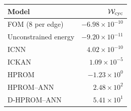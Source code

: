 \begin{tabular}{lr}
\toprule
Model & $\mathcal W_{\rm cyc}$ \\
\midrule
FOM (8 per edge) & $-6.98\times10^{-10}$ \\
Unconstrained energy & $-9.20\times10^{-11}$ \\
ICNN & $4.02\times10^{-10}$ \\
ICKAN & $1.09\times10^{-5}$ \\
HPROM & $-1.23\times10^{0}$ \\
HPROM--ANN & $2.48\times10^{2}$ \\
D-HPROM--ANN & $5.41\times10^{1}$ \\
\bottomrule
\end{tabular}

\par{}
